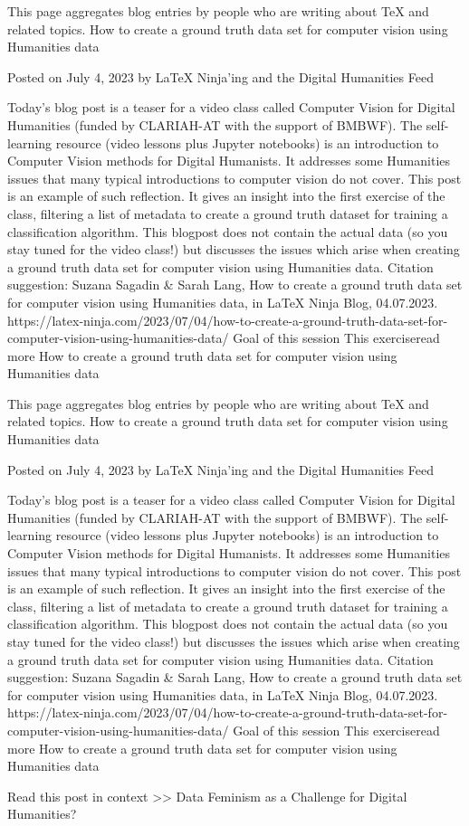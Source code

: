 \documentclass{article}
\begin{document}
This page aggregates blog entries by people who are writing about \TeX{} and related topics.
How to create a ground truth data set for computer vision using Humanities data

Posted on July 4, 2023 by \LaTeX{} Ninja'ing and the Digital Humanities Feed

Today’s blog post is a teaser for a video class called Computer Vision for Digital Humanities (funded by CLARIAH-AT with the support of BMBWF). The self-learning resource (video lessons plus Jupyter notebooks) is an introduction to Computer Vision methods for Digital Humanists. It addresses some Humanities issues that many typical introductions to computer vision do not cover. This post is an example of such reflection. It gives an insight into the first exercise of the class, filtering a list of metadata to create a ground truth dataset for training a classification algorithm. This blogpost does not contain the actual data (so you stay tuned for the video class!) but discusses the issues which arise when creating a ground truth data set for computer vision using Humanities data. Citation suggestion: Suzana Sagadin \& Sarah Lang, How to create a ground truth data set for computer vision using Humanities data, in \LaTeX{} Ninja Blog, 04.07.2023. https://latex-ninja.com/2023/07/04/how-\-to-\-create-\-a-\-ground-\-truth-\-data-\-set-\-for-\-computer-\-vision-\-using-\-humanities-\-data/ Goal of this session This exerciseread more How to create a ground truth data set for computer vision using Humanities data 
{\sloppy

}
This page aggregates blog entries by people who are writing about \TeX{} and related topics.
How to create a ground truth data set for computer vision using Humanities data

Posted on July 4, 2023 by \LaTeX{} Ninja'ing and the Digital Humanities Feed

Today’s blog post is a teaser for a video class called Computer Vision for Digital Humanities (funded by CLARIAH-AT with the support of BMBWF). The self-learning resource (video lessons plus Jupyter notebooks) is an introduction to Computer Vision methods for Digital Humanists. It addresses some Humanities issues that many typical introductions to computer vision do not cover. This post is an example of such reflection. It gives an insight into the first exercise of the class, filtering a list of metadata to create a ground truth dataset for training a classification algorithm. This blogpost does not contain the actual data (so you stay tuned for the video class!) but discusses the issues which arise when creating a ground truth data set for computer vision using Humanities data. Citation suggestion: Suzana Sagadin \& Sarah Lang, How to create a ground truth data set for computer vision using Humanities data, in \LaTeX{} Ninja Blog, 04.07.2023. https://latex-ninja.com/2023/07/04/how-\-to-\-create-\-a-\-ground-\-truth-\-data-\-set-\-for-\-computer-\-vision-\-using-\-humanities-\-data/ Goal of this session This exerciseread more How to create a ground truth data set for computer vision using Humanities data
{\sloppy 

}
Read this post in context >>
Data Feminism as a Challenge for Digital Huma\-nities?
\end{document}
